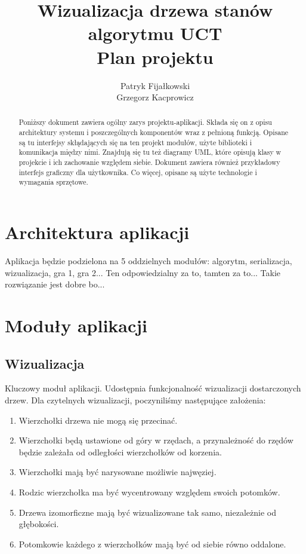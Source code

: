 \documentclass{article}
\title{
	Wizualizacja drzewa stanów algorytmu UCT \\
	\large Plan projektu}
\author{Patryk Fijałkowski \\ Grzegorz Kacprowicz}
\let\oldsection\section
\renewcommand\section{\clearpage\oldsection}
\begin{document}
	\begin{titlingpage}
		\maketitle
		\vspace{3cm}
		\begin{abstract}
			Poniższy dokument zawiera ogólny zarys projektu-aplikacji. Składa się on z opisu architektury systemu i poszczególnych komponentów wraz z pełnioną funkcją. Opisane są tu interfejsy skłądających się na ten projekt modułów, użyte biblioteki i komunikacja między nimi. Znajdują się tu też diagramy UML, które opisują klasy w projekcie i ich zachowanie względem siebie. Dokument zawiera również przykładowy interfejs graficzny dla użytkownika. Co więcej, opisane są użyte technologie i wymagania sprzętowe.
		\end{abstract}
	\end{titlingpage}

	\begin{versionhistory}
	\end{versionhistory}
	
	\tableofcontents
	
	\section{Architektura aplikacji}
	Aplikacja będzie podzielona na 5 oddzielnych modułów: algorytm, serializacja, wizualizacja, gra 1, gra 2... Ten odpowiedzialny za to, tamten za to... Takie rozwiązanie jest dobre bo...
	
	
	\section{Moduły aplikacji}
	\subsection{Wizualizacja}
	Kluczowy moduł aplikacji. Udostępnia funkcjonalność wizualizacji dostarczonych drzew. Dla czytelnych wizualizacji, poczyniliśmy następujące założenia: \\
	
	\begin{enumerate}
		\item Wierzchołki drzewa nie mogą się przecinać.
		\item Wierzchołki będą ustawione od góry w rzędach, a przynależność do
		rzędów będzie zależała od odległości wierzchołków od korzenia.
		\item Wierzchołki mają być narysowane możliwie najwęziej. 
		\item Rodzic wierzchołka ma być wycentrowany względem swoich potomków.
		\item Drzewa izomorficzne mają być wizualizowane tak samo, niezależnie od głębokości.
		\item Potomkowie każdego z wierzchołków mają być od siebie równo oddalone. \\
	\end{enumerate}
\end{document}

